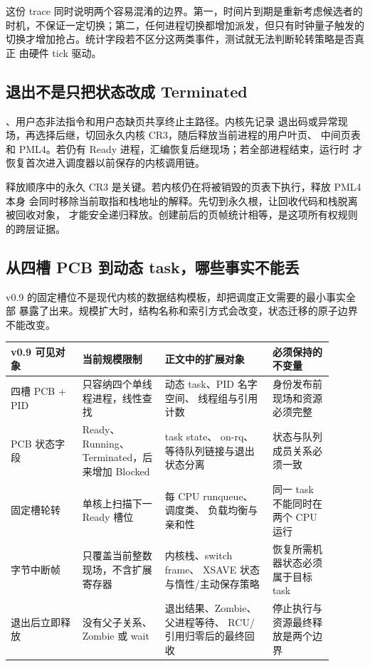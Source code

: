 这份 trace 同时说明两个容易混淆的边界。第一，时间片到期是重新考虑候选者的
时机，不保证一定切换；第二，任何进程切换都增加派发，但只有时钟量子触发的
切换才增加抢占。统计字段若不区分这两类事件，测试就无法判断轮转策略是否真正
由硬件 tick 驱动。

\subsection{退出不是只把状态改成 Terminated}

、用户态非法指令和用户态缺页共享终止主路径。内核先记录
退出码或异常现场，再选择后继，切回永久内核 CR3，随后释放当前进程的用户叶页、
中间页表和 PML4。若仍有 Ready 进程，汇编恢复后继现场；若全部进程结束，运行时
才恢复首次进入调度器以前保存的内核调用链。

释放顺序中的永久 CR3 是关键。若内核仍在将被销毁的页表下执行，释放 PML4 本身
会同时移除当前取指和栈地址的解释。先切到永久根，让回收代码和栈脱离被回收对象，
才能安全递归释放。创建前后的页帧统计相等，是这项所有权规则的跨层证据。

\subsection{从四槽 PCB 到动态 task，哪些事实不能丢}

v0.9 的固定槽位不是现代内核的数据结构模板，却把调度正文需要的最小事实全部
暴露了出来。规模扩大时，结构名称和索引方式会改变，状态迁移的原子边界不能改变。

\begin{longtable}{|L{0.20\linewidth}|L{0.23\linewidth}|L{0.30\linewidth}|L{0.17\linewidth}|}
\toprule
v0.9 可见对象 & 当前规模限制 & 正文中的扩展对象 & 必须保持的不变量 \\
\midrule
\endhead
四槽 PCB + PID & 只容纳四个单线程进程，线性查找 & 动态 task、PID 名字空间、
线程组与引用计数 & 身份发布前现场和资源必须完整 \\\tablerowrule
PCB 状态字段 & Ready、Running、Terminated，后来增加 Blocked & task state、
on-rq、等待队列链接与退出状态分离 & 状态与队列成员关系必须一致 \\\tablerowrule
固定槽轮转 & 单核上扫描下一 Ready 槽位 & 每 CPU runqueue、调度类、
负载均衡与亲和性 & 同一 task 不能同时在两个 CPU 运行 \\ 字节中断帧 & 只覆盖当前整数现场，不含扩展寄存器 & 内核栈、switch frame、
XSAVE 状态与惰性/主动保存策略 & 恢复所需机器状态必须属于目标 task \\\tablerowrule
退出后立即释放 & 没有父子关系、Zombie 或 wait & 退出结果、Zombie、父进程等待、
RCU/引用归零后的最终回收 & 停止执行与资源最终释放是两个边界 \\
\bottomrule
\end{longtable}

